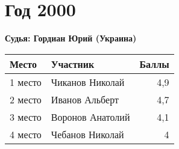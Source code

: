 \chapter{Год 2000}
\textbf{Судья: Гордиан Юрий (Украина)}

\begin{tabularx}{\textwidth}{l l r}
Место & Участник & Баллы \\
\hline
1 место & Чиканов Николай & 4,9 \\
2 место & Иванов Альберт & 4,7 \\
3 место & Воронов Анатолий & 4,1 \\
4 место & Чебанов Николай & 4 \\
\end{tabularx}